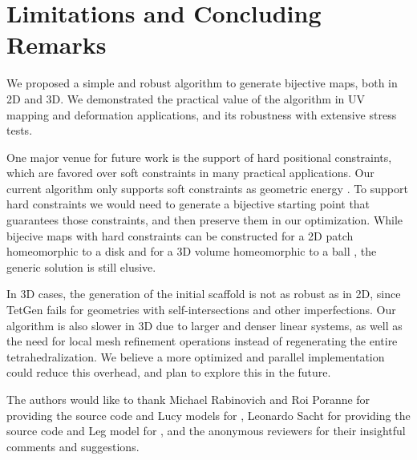 \section{Limitations and Concluding Remarks}

We proposed a simple and robust algorithm to generate bijective maps, both in 2D and 3D. We demonstrated the practical value of the algorithm in UV mapping and deformation applications, and its robustness with extensive stress tests.

One major venue for future work is the support of hard positional constraints, which are favored over soft constraints in many practical applications. Our current algorithm only supports soft constraints as geometric energy \cite{Schuller:2013}. To support hard constraints we would need to generate a bijective starting point that guarantees those constraints, and then preserve them in our optimization. While bijecive maps with hard constraints can be constructed for a 2D patch homeomorphic to a disk \cite{Weber:2014} and for a 3D volume homeomorphic to a ball \cite{Campen:2016}, the generic solution is still elusive.

In 3D cases, the generation of the initial scaffold is not as robust as in 2D, since TetGen fails for geometries with self-intersections and other imperfections. Our algorithm is also slower in 3D due to larger and denser linear systems, as well as the need for local mesh refinement operations instead of regenerating the entire tetrahedralization. We believe a more optimized and parallel implementation could reduce this overhead, and plan to explore this in the future.




 \begin{acks}
 The authors would like to thank
 Michael Rabinovich and Roi Poranne for providing the source code and Lucy models for \cite{Rabinovich:2017},
 Leonardo Sacht for providing the source code and Leg model for \cite{Sacht:2013},
 and the anonymous reviewers for their insightful comments and suggestions.
\end{acks}